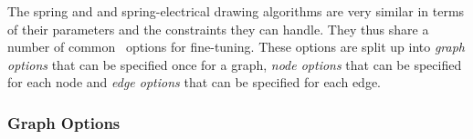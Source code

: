 The spring and and spring-electrical drawing algorithms are very similar
in terms of their parameters and the constraints they can handle. They
thus share a number of common \tikzname\ options for fine-tuning. These
options are split up into \emph{graph options} that can be specified
once for a graph, \emph{node options} that can be specified for each
node and \emph{edge options} that can be specified for each edge.

\subsubsection{Graph Options}

%
%

